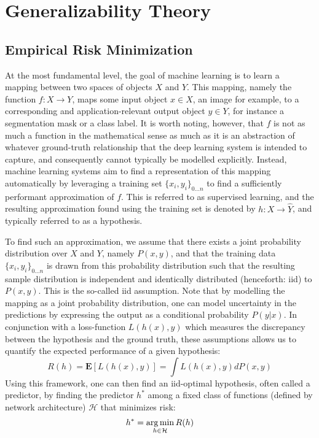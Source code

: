 \section{Generalizability Theory}

\subsection{Empirical Risk Minimization}

At the most fundamental level, the goal of machine learning is to learn a mapping between two spaces of objects \(X\) and \(Y\). This mapping, namely the function \(f: X \rightarrow Y\), maps some input object \(x \in X\), an image for example, to a corresponding and application-relevant output object \(y \in Y\), for instance a segmentation mask or a class label. It is worth noting, however, that \(f\) is not as much a function in the mathematical sense as much as it is an abstraction of whatever ground-truth relationship that the deep learning system is intended to capture, and consequently cannot typically be modelled explicitly. Instead, machine learning systems aim to find a representation of this mapping automatically by leveraging a training set \(\{x_i, y_i\}_{0...n}\) to find a sufficiently performant approximation of \(f\). This is referred to as supervised learning, and the resulting approximation found using the training set is denoted by \(h: X \rightarrow \hat{Y}\), and typically referred to as a hypothesis.

To find such an approximation, we assume that there exists a joint probability distribution over \(X\) and \(Y\), namely \(P(x,y)\), and that the training data \(\{x_i, y_i\}_{0...n}\) is drawn from this probability distribution such that the resulting sample distribution is independent and identically distributed (henceforth: iid) to \(P(x,y)\). This is the so-called iid assumption. Note that by modelling the mapping as a joint probability distribution, one can model uncertainty in the predictions by expressing the output as a conditional probability \(P(y|x)\). In conjunction with a loss-function \(L(h(x),y)\) which measures the discrepancy between the hypothesis and the ground truth, these assumptions allows us to quantify the expected performance of a given hypothesis:
\begin{equation}
    R(h) = \boldsymbol{E}[L(h(x),y)] = \int L(h(x),y) dP(x,y)
\end{equation}
Using this framework, one can then find an iid-optimal hypothesis, often called a predictor, by finding the predictor \(h^*\) among a fixed class of functions (defined by network architecture) \(\mathcal{H}\) that minimizes risk:
\begin{equation}
    h^* = \operatorname*{arg\,min}_{h \in \mathcal{H}}R(h)
\end{equation}

